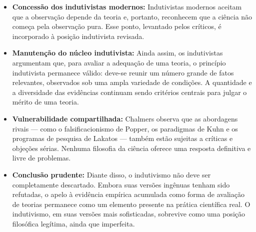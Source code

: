 \documentclass[9pt,a4paper]{extarticle}
\begin{document}
\begin{itemize}
    \item \textbf{Concessão dos indutivistas modernos:} Indutivistas modernos aceitam que a observação depende da teoria e, portanto, reconhecem que a ciência não começa pela observação pura. Esse ponto, levantado pelos críticos, é incorporado à posição indutivista revisada.

    \item \textbf{Manutenção do núcleo indutivista:} Ainda assim, os indutivistas argumentam que, para avaliar a adequação de uma teoria, o princípio indutivista permanece válido: deve-se reunir um número grande de fatos relevantes, observados sob uma ampla variedade de condições. A quantidade e a diversidade das evidências continuam sendo critérios centrais para julgar o mérito de uma teoria.

    \item \textbf{Vulnerabilidade compartilhada:} Chalmers observa que as abordagens rivais --- como o falsificacionismo de Popper, os paradigmas de Kuhn e os programas de pesquisa de Lakatos --- também estão sujeitas a críticas e objeções sérias. Nenhuma filosofia da ciência oferece uma resposta definitiva e livre de problemas.

    \item \textbf{Conclusão prudente:} Diante disso, o indutivismo não deve ser completamente descartado. Embora suas versões ingênuas tenham sido refutadas, o apelo à evidência empírica acumulada como forma de avaliação de teorias permanece como um elemento presente na prática científica real. O indutivismo, em suas versões mais sofisticadas, sobrevive como uma posição filosófica legítima, ainda que imperfeita.
\end{itemize}

   

\end{document}
